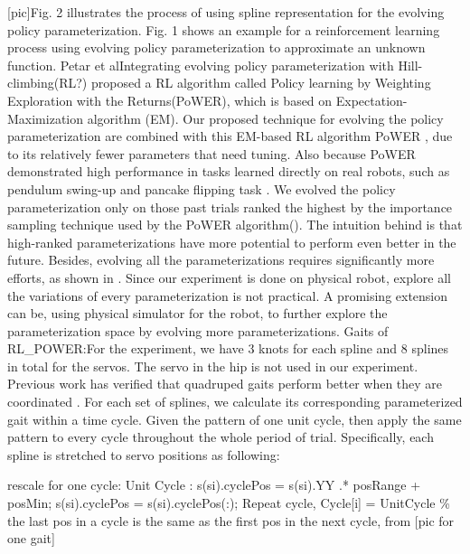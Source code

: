 [pic]Fig. 2 illustrates the process of using spline
representation for the evolving policy parameterization. Fig. 1 shows
an example for a reinforcement learning process using evolving policy
parameterization to approximate an unknown function. Petar et
alIntegrating evolving policy parameterization with
Hill-climbing(RL?) \cite{kober2009learning-motor-primitives} proposed a RL algorithm
called Policy learning by Weighting Exploration with the
Returns(PoWER), which is based on Expectation-Maximization algorithm
(EM). Our proposed technique for evolving the policy parameterization
are combined with this EM-based RL algorithm PoWER \cite{kober2009learning-motor-primitives}, due to its
relatively fewer parameters that need tuning. Also because PoWER
demonstrated high performance in tasks learned directly on real
robots, such as pendulum swing-up and pancake flipping task \cite{kormushev2010robot-motor-skill}. We
evolved the policy parameterization only on those past trials ranked
the highest by the importance sampling technique used by the PoWER
algorithm(). The intuition behind is that high-ranked
parameterizations have more potential to perform even better in the
future. Besides, evolving all the parameterizations requires
significantly more efforts, as shown in \cite{bongard2006resilient-machines-through}. Since our experiment
is done on physical robot, explore all the variations of every
parameterization is not practical. A promising extension can be, using
physical simulator for the robot, to further explore the
parameterization space by evolving more parameterizations. Gaits of
RL\_POWER:For the experiment, we have 3 knots for each spline and 8
splines in total for the servos. The servo in the hip is not used in
our experiment. Previous work has verified that quadruped gaits
perform better when they are coordinated \cite{clune2009evolving-coordinated-quadruped} \cite{clune2011on-the-performance-of-indirect-encoding}
\cite{valsalam2008modular-neuroevolution-for-multilegged}. For each set of
splines, we calculate its corresponding parameterized gait within a
time cycle. Given the pattern of one unit cycle, then apply the same
pattern to every cycle throughout the whole period of
trial. Specifically, each spline is stretched to servo positions as
following:

\begin{graycode}
rescale for one cycle:
Unit Cycle :
s(si).cyclePos = s(si).YY .* posRange + posMin;
s(si).cyclePos = s(si).cyclePos(:);
Repeat cycle,
Cycle[i] = UnitCycle \% the last pos in a cycle is the
same as the first pos in the next cycle, from [pic for one gait]
\end{graycode}
